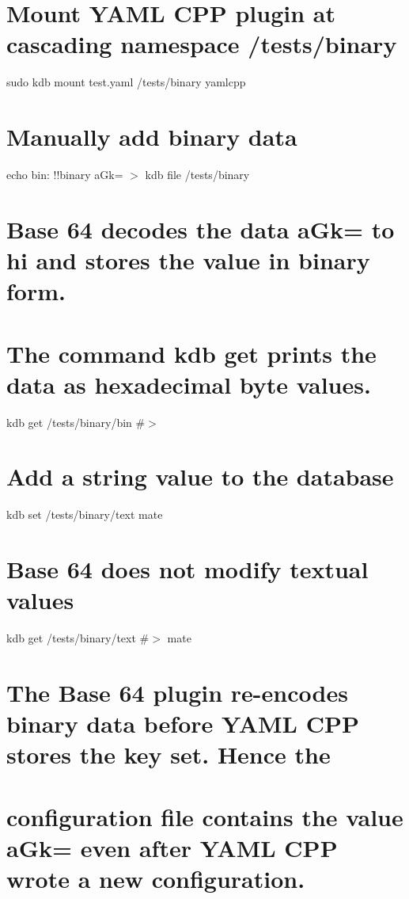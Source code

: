  \section*{Mount Y\+A\+ML C\+PP plugin at cascading namespace {\ttfamily /tests/binary}}

sudo kdb mount test.\+yaml /tests/binary yamlcpp \section*{Manually add binary data}

echo \textquotesingle{}bin\+: !!binary a\+Gk=\textquotesingle{} $>$ {\ttfamily kdb file /tests/binary}

\section*{Base 64 decodes the data {\ttfamily a\+Gk=} to {\ttfamily hi} and stores the value in binary form.}

\section*{The command {\ttfamily kdb get} prints the data as hexadecimal byte values.}

kdb get /tests/binary/bin \#$>$ 

\section*{Add a string value to the database}

kdb set /tests/binary/text mate \section*{Base 64 does not modify textual values}

kdb get /tests/binary/text \#$>$ mate

\section*{The Base 64 plugin re-\/encodes binary data before Y\+A\+ML C\+PP stores the key set. Hence the}

\section*{configuration file contains the value {\ttfamily a\+Gk=} even after Y\+A\+ML C\+PP wrote a new configuration.}

